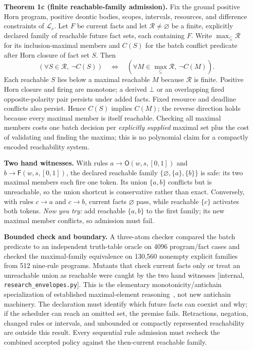 \documentclass[11pt,a4paper]{article}
\newcommand{\Ob}{\mathsf{O}}
\newcommand{\Fb}{\mathsf{F}}
\begin{document}
\begin{thebox}
\textbf{Theorem 1c (finite reachable-family admission).} Fix the ground positive Horn program, positive deontic bodies, scopes,
intervals, resources, and difference constraints of $\mathcal L_c$. Let $F$ be current facts and let
$\mathcal R\ne\varnothing$ be a finite, explicitly declared family of reachable future fact sets, each containing $F$.
Write $\max_\subseteq\mathcal R$ for its inclusion-maximal members and $C(S)$ for the batch conflict predicate after Horn
closure of fact set $S$. Then
\[
  (\forall S\in\mathcal R,\ \neg C(S))
  \quad\Longleftrightarrow\quad
  (\forall M\in\max_\subseteq\mathcal R,\ \neg C(M)).
\]
Each reachable $S$ lies below a maximal reachable $M$ because $\mathcal R$ is finite. Positive Horn closure and firing are
monotone; a derived $\bot$ or an overlapping fired opposite-polarity pair persists under added facts. Fixed resource and
deadline conflicts also persist. Hence $C(S)$ implies $C(M)$; the reverse direction holds because every maximal member is
itself reachable. Checking all maximal members costs one batch decision per \emph{explicitly supplied} maximal set plus the
cost of validating and finding the maxima; this is no polynomial claim for a compactly encoded reachability system.
\end{thebox}

\noindent\textbf{Two hand witnesses.} With rules $a\to\Ob(w,s,[0,1])$ and
$b\to\Fb(w,s,[0,1])$, the declared reachable family
$\{\varnothing,\{a\},\{b\}\}$ is safe: its two maximal members each fire one token. Its union $\{a,b\}$ conflicts but is
unreachable, so the union shortcut is conservative rather than exact. Conversely, with rules $c\to a$ and $c\to b$, current
facts $\varnothing$ pass, while reachable $\{c\}$ activates both tokens. \emph{Now you try:} add reachable $\{a,b\}$ to the
first family; its new maximal member conflicts, so admission must fail.

\noindent\textbf{Bounded check and boundary.} A three-atom checker compared the batch predicate to an independent
truth-table oracle on 4096 program/fact cases and checked the maximal-family equivalence on 130{,}560 nonempty explicit
families from 512 nine-rule programs. Mutants that check current facts only or treat an unreachable union as reachable were
caught by the two hand witnesses [internal, \texttt{research\_envelopes.py}]. This is the elementary monotonicity/antichain
specialization of established maximal-element reasoning~\cite{doyenraskin2009}, not new antichain machinery. The declaration
must identify which future facts can coexist and why; if the scheduler can reach an omitted set, the premise fails.
Retractions, negation, changed rules or intervals, and unbounded or compactly represented reachability are outside this
result. Every sequential rule admission must recheck the combined accepted policy against the then-current reachable family.
\end{document}
